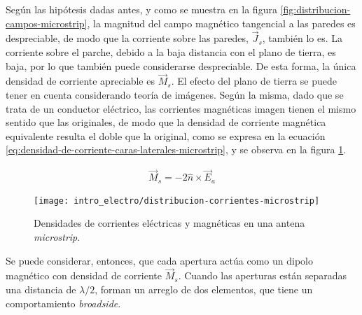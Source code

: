 Según las hipótesis dadas antes, y como se muestra en la figura \ref{fig:distribucion-campos-microstrip}, la magnitud del campo magnético tangencial a las paredes es despreciable, de modo que la corriente sobre las paredes, $\vec{J}_s$, también lo es. La corriente sobre el parche, debido a la baja distancia con el plano de tierra, es baja, por lo que también puede considerarse despreciable. De esta forma, la única densidad de corriente apreciable es $\vec{M}_s$. El efecto del plano de tierra se puede tener en cuenta considerando teoría de imágenes. Según la misma, dado que se trata de un conductor eléctrico, las corrientes magnéticas imagen tienen el mismo sentido que las originales, de modo que la densidad de corriente magnética equivalente resulta el doble que la original, como se expresa en la ecuación \ref{eq:densidad-de-corriente-caras-laterales-microstrip}, y se observa en la figura \ref{fig:densidad-corriente-microstrip}.

\begin{align}
	\label{eq:densidad-de-corriente-caras-laterales-microstrip}
	\vec{M}_s = -2 \hat{n} \times \vec{E}_a
\end{align}

\begin{figure}[htp]
	\centering
	\texttt{[image: intro\_electro/distribucion-corrientes-microstrip]}
	\caption{Densidades de corrientes eléctricas y magnéticas en una antena \textit{microstrip}.}
	\label{fig:densidad-corriente-microstrip}
\end{figure}

Se puede considerar, entonces, que cada apertura actúa como un dipolo magnético con densidad de corriente $\vec{M}_s$. Cuando las aperturas están separadas una distancia de $\lambda/2$, forman un arreglo de dos elementos, que tiene un comportamiento \textit{broadside}.


